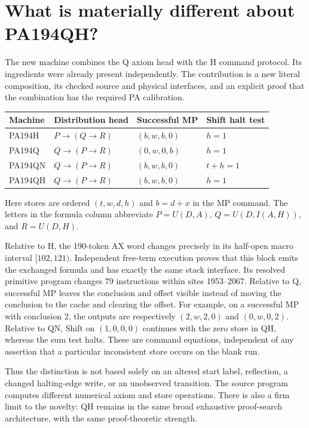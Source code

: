\documentclass[11pt,letterpaper]{article}
\begin{document}


\section{What is materially different about PA194QH?}
\label{sec:difference}

The new machine combines the Q axiom head with the H command protocol.
Its ingredients were already present independently. The contribution is a
new literal composition, its checked source and physical interfaces, and
an explicit proof that the combination has the required PA calibration.

\begin{center}\small
\begin{tabular}{@{}llll@{}}
\toprule
Machine & Distribution head & Successful MP & Shift halt test \\
\midrule
PA194H & $P\to(Q\to R)$ & $(b,w,b,0)$ & $h=1$ \\
PA194Q & $Q\to(P\to R)$ & $(0,w,0,b)$ & $h=1$ \\
PA194QN & $Q\to(P\to R)$ & $(b,w,b,0)$ & $t+h=1$ \\
PA194QH & $Q\to(P\to R)$ & $(b,w,b,0)$ & $h=1$ \\
\bottomrule
\end{tabular}
\end{center}
Here stores are ordered $(t,w,d,h)$ and $b=d+x$ in the MP command. The
letters in the formula column abbreviate
$P=U(D,A)$, $Q=U(D,I(A,H))$, and $R=U(D,H)$.

Relative to H, the 190-token AX word changes precisely in its half-open
macro interval $[102,121)$. Independent free-term execution proves that
this block emits the exchanged formula and has exactly the same stack
interface. Its resolved primitive program changes 79 instructions within
sites 1953--2067. Relative to Q, successful MP leaves the conclusion and
offset visible instead of moving the conclusion to the cache and clearing
the offset. For example, on a successful MP with conclusion 2, the outputs
are respectively $(2,w,2,0)$ and $(0,w,0,2)$. Relative to QN, Shift on
$(1,0,0,0)$ continues with the zero store in QH, whereas the sum test halts.
These are command equations, independent of any assertion that a
particular inconsistent store occurs on the blank run.

Thus the distinction is not based solely on an altered start label,
reflection, a changed halting-edge write, or an unobserved transition. The
source program computes different numerical axiom and store operations.
There is also a firm limit to the novelty: QH remains in the same broad
exhaustive proof-search architecture, with the same proof-theoretic strength.
\end{document}
